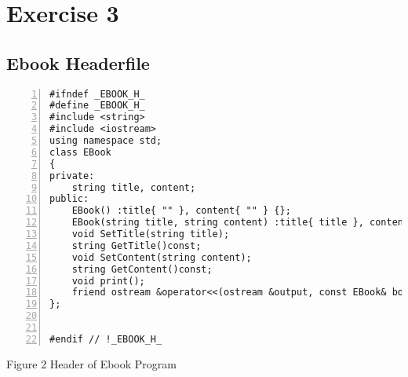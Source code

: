 \documentclass{llncs}
\begin{document}
\section{Exercise 3}
\subsection{Ebook Headerfile}

\begin{lstlisting}[basicstyle=\footnotesize\ttfamily, numbers=left, stepnumber=1, numberstyle = \normalsize]
#ifndef _EBOOK_H_
#define _EBOOK_H_
#include <string>
#include <iostream>
using namespace std;
class EBook
{
private:
	string title, content; 
public:
	EBook() :title{ "" }, content{ "" } {};
	EBook(string title, string content) :title{ title }, content{ content }{};
	void SetTitle(string title);
	string GetTitle()const;
	void SetContent(string content);
	string GetContent()const;
	void print();
	friend ostream &operator<<(ostream &output, const EBook& book);
};


#endif // !_EBOOK_H_

\end{lstlisting}
\footnotesize{Figure 2 Header of Ebook Program}\newline

\newpage
\end{document}

